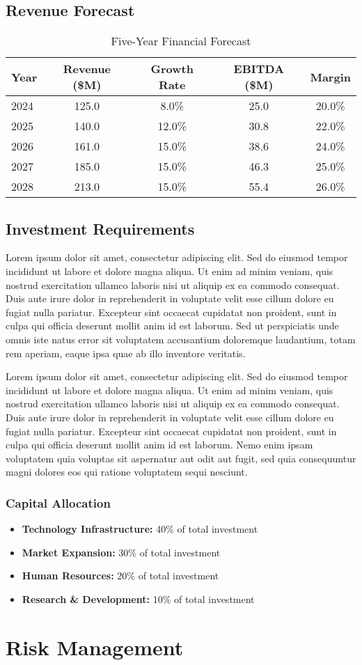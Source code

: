 \documentclass[11pt,a4paper]{article}
\newcommand{\loremtext}[1]{%
  Lorem ipsum dolor sit amet, consectetur adipiscing elit. Sed do eiusmod tempor incididunt ut labore et dolore magna aliqua. Ut enim ad minim veniam, quis nostrud exercitation ullamco laboris nisi ut aliquip ex ea commodo consequat. Duis aute irure dolor in reprehenderit in voluptate velit esse cillum dolore eu fugiat nulla pariatur. Excepteur sint occaecat cupidatat non proident, sunt in culpa qui officia deserunt mollit anim id est laborum.%
}
\begin{document}
\subsection{Revenue Forecast}

\begin{table}[h]
\centering
\begin{tabular}{|l|c|c|c|c|}
\hline
\textbf{Year} & \textbf{Revenue (\$M)} & \textbf{Growth Rate} & \textbf{EBITDA (\$M)} & \textbf{Margin} \\
\hline
2024 & 125.0 & 8.0\% & 25.0 & 20.0\% \\
\hline
2025 & 140.0 & 12.0\% & 30.8 & 22.0\% \\
\hline
2026 & 161.0 & 15.0\% & 38.6 & 24.0\% \\
\hline
2027 & 185.0 & 15.0\% & 46.3 & 25.0\% \\
\hline
2028 & 213.0 & 15.0\% & 55.4 & 26.0\% \\
\hline
\end{tabular}
\caption{Five-Year Financial Forecast}
\end{table}

\subsection{Investment Requirements}

\loremtext{12} Sed ut perspiciatis unde omnis iste natus error sit voluptatem accusantium doloremque laudantium, totam rem aperiam, eaque ipsa quae ab illo inventore veritatis.

\loremtext{13} Nemo enim ipsam voluptatem quia voluptas sit aspernatur aut odit aut fugit, sed quia consequuntur magni dolores eos qui ratione voluptatem sequi nesciunt.

\subsubsection{Capital Allocation}
\begin{itemize}
  \item \textbf{Technology Infrastructure:} 40\% of total investment
  \item \textbf{Market Expansion:} 30\% of total investment
  \item \textbf{Human Resources:} 20\% of total investment
  \item \textbf{Research \& Development:} 10\% of total investment
\end{itemize}

\section{Risk Management}
\end{document}
